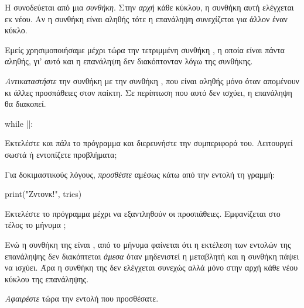 \documentclass[a4paper,11pt,oneside]{book}
\begin{document}
\begin{step}

Η  συνοδεύεται από μια \emph{συνθήκη}. Στην \emph{αρχή} κάθε κύκλου, η συνθήκη αυτή ελέγχεται εκ νέου. Αν η συνθήκη είναι αληθής τότε η επανάληψη συνεχίζεται για άλλον έναν κύκλο. 

Εμείς χρησιμοποιήσαμε μέχρι τώρα την τετριμμένη συνθήκη , η οποία είναι πάντα αληθής, γι' αυτό και η επανάληψη δεν διακόπτονταν λόγω της συνθήκης.

\emph{Αντικαταστήστε} την συνθήκη  με την συνθήκη , που είναι αληθής μόνο όταν απομένουν κι άλλες προσπάθειες στον παίκτη. Σε περίπτωση που αυτό δεν ισχύει, η επανάληψη θα διακοπεί.

\begin{pyplain}
while ||:
\end{pyplain}

Εκτελέστε και πάλι το πρόγραμμα και διερευνήστε την συμπεριφορά του. Λειτουργεί σωστά ή εντοπίζετε προβλήματα;

\marginnote[14pt]{\icondiscuss}
\dottedline
\end{step}

\begin{step}
Για δοκιμαστικούς λόγους, \emph{προσθέστε} αμέσως κάτω από την εντολή  τη γραμμή:

\begin{pynew}
print("Ζντονκ!", tries)
\end{pynew}

Εκτελέστε το πρόγραμμα μέχρι να εξαντληθούν οι προσπάθειες. Eμφανίζεται στο τέλος το μήνυμα ;

\marginnote[14pt]{\icondiscuss}
\dottedline

Ενώ η συνθήκη της  είναι , από το μήνυμα φαίνεται ότι η εκτέλεση των εντολών της επανάληψης δεν διακόπτεται \emph{άμεσα} όταν μηδενιστεί η μεταβλητή  και η συνθήκη πάψει να ισχύει. Άρα η συνθήκη  της  δεν ελέγχεται συνεχώς αλλά μόνο στην αρχή κάθε νέου κύκλου της επανάληψης.

\emph{Αφαιρέστε} τώρα την εντολή που προσθέσατε.
\end{step}
\end{document}
